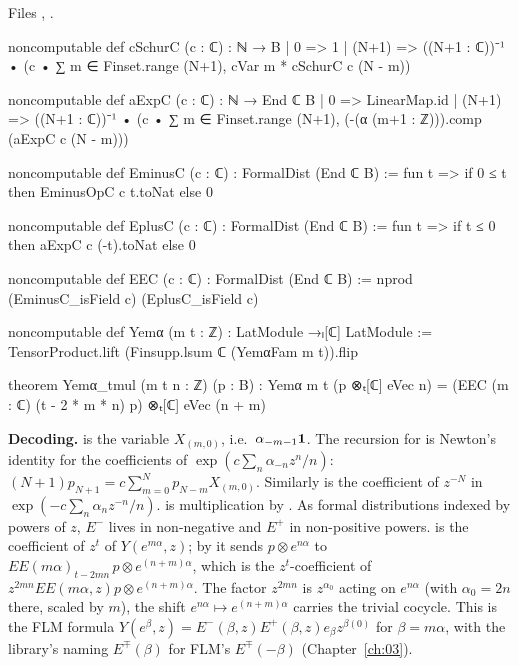 \noindent Files , .
\begin{leancode}
noncomputable def cSchurC (c : ℂ) : ℕ → B
  | 0 => 1
  | (N+1) => ((N+1 : ℂ))⁻¹ • (c • ∑ m ∈ Finset.range (N+1), cVar m * cSchurC c (N - m))

noncomputable def aExpC (c : ℂ) : ℕ → End ℂ B
  | 0 => LinearMap.id
  | (N+1) => ((N+1 : ℂ))⁻¹ • (c • ∑ m ∈ Finset.range (N+1), (-(α (m+1 : ℤ))).comp (aExpC c (N - m)))

noncomputable def EminusC (c : ℂ) : FormalDist (End ℂ B) :=
  fun t => if 0 ≤ t then EminusOpC c t.toNat else 0

noncomputable def EplusC (c : ℂ) : FormalDist (End ℂ B) :=
  fun t => if t ≤ 0 then aExpC c (-t).toNat else 0

noncomputable def EEC (c : ℂ) : FormalDist (End ℂ B) := nprod (EminusC_isField c) (EplusC_isField c)

noncomputable def Yemα (m t : ℤ) : LatModule →ₗ[ℂ] LatModule :=
  TensorProduct.lift (Finsupp.lsum ℂ (YemαFam m t)).flip

theorem Yemα_tmul (m t n : ℤ) (p : B) :
    Yemα m t (p ⊗ₜ[ℂ] eVec n) = (EEC (m : ℂ) (t - 2 * m * n) p) ⊗ₜ[ℂ] eVec (n + m)
\end{leancode}

\begin{dictionary}
\textbf{Decoding.}  is the variable $X_{(m,0)}$, i.e.\ $\alpha_{-m-1}\mathbf{1}$. The recursion for
 is Newton's identity for the coefficients of $\exp(c\sum_n\alpha_{-n}z^n/n)$:
$(N+1)p_{N+1}=c\sum_{m=0}^Np_{N-m}X_{(m,0)}$. Similarly  is the coefficient of $z^{-N}$ in
$\exp(-c\sum_n\alpha_nz^{-n}/n)$.  is multiplication by . As formal
distributions indexed by powers of $z$, $E^-$ lives in non-negative and $E^+$ in non-positive powers.
 is the coefficient of $z^t$ of $Y(e^{m\alpha},z)$; by  it sends
$p\otimes e^{n\alpha}$ to $EE(m\alpha)_{t-2mn}\,p\otimes e^{(n+m)\alpha}$, which is the $z^t$-coefficient of
$z^{2mn}EE(m\alpha,z)p\otimes e^{(n+m)\alpha}$. The factor $z^{2mn}$ is $z^{\alpha_0}$ acting on $e^{n\alpha}$ (with
$\alpha_0=2n$ there, scaled by $m$), the shift $e^{n\alpha}\mapsto e^{(n+m)\alpha}$ carries the trivial cocycle. This is
the FLM formula $Y(e^\beta,z)=E^-(\beta,z)E^+(\beta,z)e_\beta z^{\beta(0)}$ for $\beta=m\alpha$, with the library's
naming $E^\mp(\beta)$ for FLM's $E^\mp(-\beta)$ (Chapter~\ref{ch:03}).
\end{dictionary}

